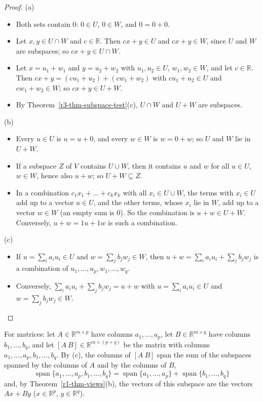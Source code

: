 \documentclass[12pt]{article}
\newcommand{\R}{\mathbb R}
\DeclareMathOperator{\Span}{span}
\theoremstyle{definition}
\begin{document}
\begin{proof}
(a)
\begin{itemize}
\item Both sets contain \(0\): \(0\in U\), \(0\in W\), and \(0=0+0\).
\item Let \(x,y\in U\cap W\) and \(c\in\R\). Then \(cx+y\in U\) and \(cx+y\in W\), since \(U\)
and \(W\) are subspaces; so \(cx+y\in U\cap W\).
\item Let \(x=u_1+w_1\) and \(y=u_2+w_2\) with \(u_1,u_2\in U\), \(w_1,w_2\in W\), and let
\(c\in\R\). Then \(cx+y=(cu_1+u_2)+(cw_1+w_2)\) with \(cu_1+u_2\in U\) and \(cw_1+w_2\in W\);
so \(cx+y\in U+W\).
\item By Theorem~\ref{r3-thm-subspace-test}(c), \(U\cap W\) and \(U+W\) are subspaces.
\end{itemize}
(b)
\begin{itemize}
\item Every \(u\in U\) is \(u=u+0\), and every \(w\in W\) is \(w=0+w\); so \(U\) and \(W\) lie
in \(U+W\).
\item If a subspace \(Z\) of \(V\) contains \(U\cup W\), then it contains \(u\) and \(w\) for all
\(u\in U\), \(w\in W\), hence also \(u+w\); so \(U+W\subseteq Z\).
\item In a combination \(c_1x_1+\dots+c_kx_k\) with all \(x_i\in U\cup W\), the terms with
\(x_i\in U\) add up to a vector \(u\in U\), and the other terms, whose \(x_i\) lie in \(W\), add
up to a vector \(w\in W\) (an empty sum is \(0\)). So the combination is \(u+w\in U+W\).
Conversely, \(u+w=1u+1w\) is such a combination.
\end{itemize}
(c)
\begin{itemize}
\item If \(u=\sum_ia_iu_i\in U\) and \(w=\sum_jb_jw_j\in W\), then
\(u+w=\sum_ia_iu_i+\sum_jb_jw_j\) is a combination of \(u_1,\dots,u_p,w_1,\dots,w_q\).
\item Conversely, \(\sum_ia_iu_i+\sum_jb_jw_j=u+w\) with \(u=\sum_ia_iu_i\in U\) and
\(w=\sum_jb_jw_j\in W\).\qedhere
\end{itemize}
\end{proof}

For matrices: let \(A\in\R^{m\times p}\) have columns \(a_1,\dots,a_p\), let \(B\in\R^{m\times q}\)
have columns \(b_1,\dots,b_q\), and let \([A\ B]\in\R^{m\times(p+q)}\) be the matrix with columns
\(a_1,\dots,a_p,b_1,\dots,b_q\). By (c), the columns of \([A\ B]\) span the sum of the subspaces
spanned by the columns of \(A\) and by the columns of \(B\),
\[
\Span\{a_1,\dots,a_p,b_1,\dots,b_q\}=\Span\{a_1,\dots,a_p\}+\Span\{b_1,\dots,b_q\}
\]
and, by Theorem~\ref{r1-thm-views}(b), the vectors of this subspace are the vectors \(Ax+By\)
(\(x\in\R^p\), \(y\in\R^q\)).
\end{document}
